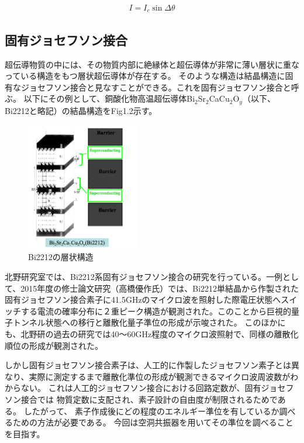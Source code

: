 \begin{eqnarray}
   I = I_c \sin{\Delta \theta }
\end{eqnarray}

\subsection*{固有ジョセフソン接合}
超伝導物質の中には、その物質内部に絶縁体と超伝導体が非常に薄い層状に重なっている構造をもつ層状超伝導体が存在する。
そのような構造は結晶構造に固有なジョセフソン接合と見なすことができる。これを固有ジョセフソン接合と呼ぶ。
以下にその例として、銅酸化物高温超伝導体Bi$_2$Sr$_2$CaCu$_2$O$_y$（以下、Bi2212と略記）の結晶構造をFig1.2示す\cite{びすます}。
\vspace{10 mm}

\begin{figure}[h]
  \begin{center}
    \includegraphics[width=5cm]{./image/IJJ.png}
    \caption{Bi2212の層状構造}
    \label{fig:Cavity}
  \end{center}
\end{figure}

北野研究室では、Bi2212系固有ジョセフソン接合の研究を行っている。一例として、2015年度の修士論文研究（高橋優作氏）\cite{たかはし}では、Bi2212単結晶から作製された固有ジョセフソン接合素子に41.5GHzのマイクロ波を照射した際電圧状態へスイッチする電流の確率分布に２重ピーク構造が観測された。このことから巨視的量子トンネル状態への移行と離散化量子準位の形成が示唆された。
このほかにも、北野研の過去の研究では40〜60GHz程度のマイクロ波照射で、同様の離散化順位の形成が観測された。

しかし固有ジョセフソン接合素子は、人工的に作製したジョセフソン素子とは異なり、実際に測定するまで離散化準位の形成が観測できるマイクロ波周波数がわからない。
これは人工的ジョセフソン接合における回路定数が、固有ジョセフソン接合では
物質定数に支配され、素子設計の自由度が制限されるためである。
したがって、
素子作成後にどの程度のエネルギー準位を有しているか調べるための方法が必要である。
今回は空洞共振器を用いてその準位を調べることを目指す。


